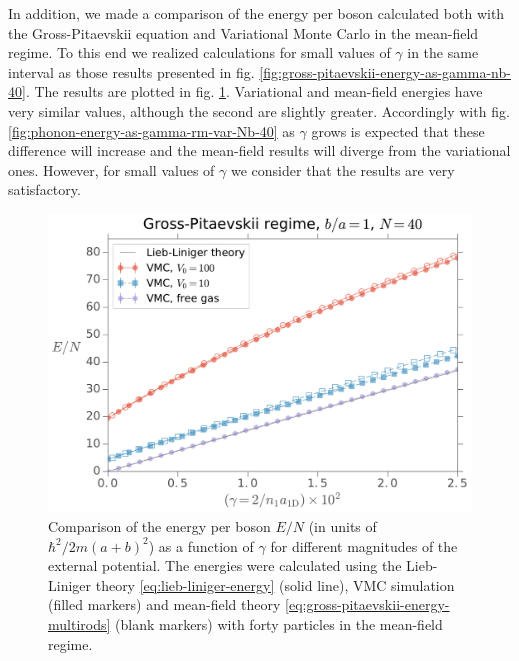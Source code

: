 In addition, we made a comparison of the energy per boson calculated both with
the Gross-Pitaevskii equation and Variational Monte Carlo in the mean-field
regime. To this end we realized calculations for small values of $\gamma$ in the
same interval as those results presented in fig.
\ref{fig:gross-pitaevskii-energy-as-gamma-nb-40}. The results are plotted in
fig. \ref{fig:phonon-gp-energy-as-gamma-rm-var-nb-40}. Variational and
mean-field energies have very similar values, although the second are slightly
greater. Accordingly with fig. \ref{fig:phonon-energy-as-gamma-rm-var-Nb-40} as
$\gamma$ grows is expected that these difference will increase and the
mean-field results will diverge from the variational ones. However, for small
values of $\gamma$ we consider that the results are very satisfactory.


\begin{figure}
  \centering
  \includegraphics[width=0.75\linewidth]{./figures/phonon-gp_energy-as-gamma_rm-var_Nb-40}
  \caption{ Comparison of the energy per boson $E/N$ (in units of $\hbar^2/2m(a
      + b)^2$) as a function of $\gamma$ for different magnitudes of the external
    potential. The energies were calculated using the Lieb-Liniger theory
    \eqref{eq:lieb-liniger-energy} (solid line), VMC simulation (filled markers)
    and mean-field theory \eqref{eq:gross-pitaevskii-energy-multirods} (blank
    markers) with forty particles in the mean-field regime. }
  \label{fig:phonon-gp-energy-as-gamma-rm-var-nb-40}
\end{figure}


